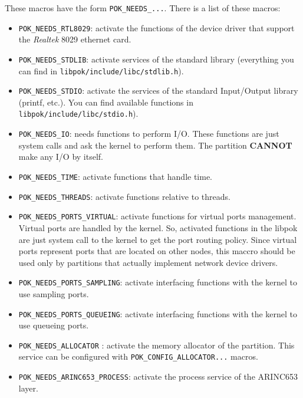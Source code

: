    These macros have the form \texttt{POK\_NEEDS\_...}. There is a list of
   these macros:
   \begin{itemize}
      \item
         \texttt{POK\_NEEDS\_RTL8029}: activate the functions of the device
         driver that support the \textit{Realtek} 8029 ethernet card.
      \item
         \texttt{POK\_NEEDS\_STDLIB}: activate services of the standard
         library (everything you can find in
         \texttt{libpok/include/libc/stdlib.h}).
      \item
         \texttt{POK\_NEEDS\_STDIO}: activate the services of the standard
         Input/Output library (printf, etc.). You can find available functions
         in \texttt{libpok/include/libc/stdio.h}).
      \item
         \texttt{POK\_NEEDS\_IO}: needs functions to perform I/O. These
         functions are just system calls and ask the kernel to perform them. The
         partition \textbf{CANNOT} make any I/O by itself.
      \item
         \texttt{POK\_NEEDS\_TIME}: activate functions that handle time.
      \item
         \texttt{POK\_NEEDS\_THREADS}: activate functions relative to threads.
      \item
         \texttt{POK\_NEEDS\_PORTS\_VIRTUAL}: activate functions for virtual
         ports management. Virtual ports are handled by the kernel. So,
         activated functions in the libpok are just system call to the kernel to
         get the port routing policy. Since virtual ports represent ports that
         are located on other nodes, this maccro should be used only by
         partitions that actually implement network device drivers.
      \item
         \texttt{POK\_NEEDS\_PORTS\_SAMPLING}: activate interfacing functions with the
         kernel to use sampling ports.
      \item
         \texttt{POK\_NEEDS\_PORTS\_QUEUEING}: activate interfacing functions
         with the kernel to use queueing ports.
      \item
         \texttt{POK\_NEEDS\_ALLOCATOR} : activate the memory allocator of the
         partition. This service can be configured with
         \texttt{POK\_CONFIG\_ALLOCATOR...} macros.
      \item
         \texttt{POK\_NEEDS\_ARINC653\_PROCESS}: activate the process service of
         the ARINC653 layer.

\end{itemize}
